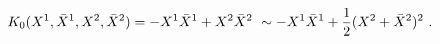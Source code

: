 \begin{equation}
K_0(X^1,\bar{X}^1,X^2,\bar{X}^2)=-X^1\bar{X}^1+X^2\bar{X}^2
~\sim -X^1\bar{X}^1+{1\over 2}(X^2+\bar{X}^2)^2 \ .
\label{k0;beta}
\end{equation}

